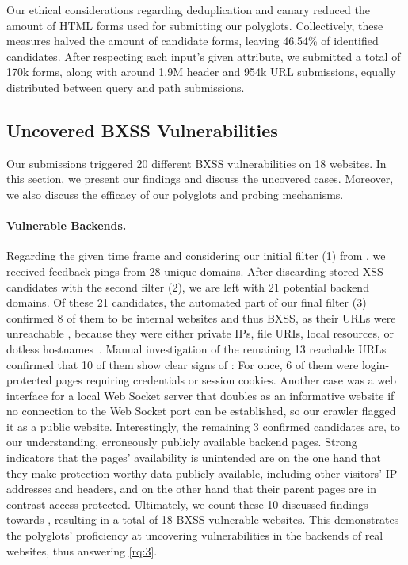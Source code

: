 Our ethical considerations regarding deduplication and canary reduced the amount of HTML forms used for submitting our polyglots.
Collectively, these measures halved the amount of candidate forms, leaving \num{46.54}\% of identified candidates.
After respecting each input's given  attribute, we submitted a total of \num{170}k forms, along with around \num{1.9}M header and \num{954}k URL submissions, equally distributed between query and path submissions.

\subsection{Uncovered BXSS Vulnerabilities}\label{sec:uncovered-vulns}
Our submissions triggered \num{20} different BXSS vulnerabilities on \num{18} websites.
In this section, we present our findings and discuss the uncovered \blindxss{} cases.
Moreover, we also discuss the efficacy of our polyglots and probing mechanisms.

\vspace{-1em}\paragraph{Vulnerable Backends.}
Regarding the given time frame and considering our initial filter (1) from , we received feedback pings from \num{28} unique domains. %
After discarding stored XSS candidates with the second filter (2), we are left with \num{21} potential backend domains.
Of these \num{21} candidates, the automated part of our final filter (3) confirmed \num{8} of them to be internal websites and thus BXSS, as their URLs were unreachable \eg, because they were either private IPs, file URIs, local resources, or dotless hostnames~\cite{icann-dotless-hosts:2012}. %
Manual investigation of the remaining \num{13} reachable URLs confirmed that \num{10} of them show clear signs of \blindxss{}:
For once, \num{6} of them were login-protected pages requiring credentials or session cookies.
Another case was a web interface for a local Web Socket server that doubles as an informative website if no connection to the Web Socket port can be established, so our crawler flagged it as a public website.
Interestingly, the remaining \num{3} confirmed candidates are, to our understanding, erroneously publicly available backend pages.
Strong indicators that the pages' availability is unintended are on the one hand that they make protection-worthy data publicly available, including other visitors' IP addresses and headers, and on the other hand that their parent pages are in contrast access-protected.
Ultimately, we count these \num{10} discussed findings towards \blindxss{}, resulting in a total of \num{18} BXSS-vulnerable websites.
This demonstrates the polyglots' proficiency at uncovering \blindxss{} vulnerabilities in the backends of real websites, thus answering \ref{rq:3}.


